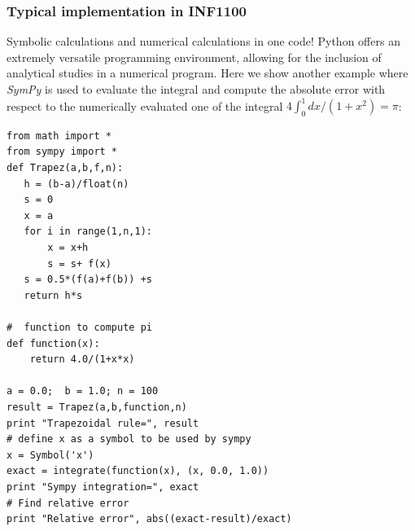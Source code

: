 \documentclass{beamer}
\begin{document}
\begin{frame}
\frametitle{Typical implementation in INF1100}

\begin{block}{Symbolic calculations and numerical calculations in one code! }
Python offers an  extremely versatile programming  environment, allowing for the inclusion of analytical studies in a numerical program. Here we show another example
where \emph{SymPy} is used to evaluate the integral and compute the absolute error 
with respect to the numerically evaluated one of the integral
$4\int_0^1 dx/(1+x^2) = \pi$: 
\begin{verbatim}
from math import *
from sympy import *
def Trapez(a,b,f,n):
   h = (b-a)/float(n)
   s = 0
   x = a
   for i in range(1,n,1):
       x = x+h
       s = s+ f(x)
   s = 0.5*(f(a)+f(b)) +s
   return h*s

#  function to compute pi
def function(x):
    return 4.0/(1+x*x)

a = 0.0;  b = 1.0; n = 100
result = Trapez(a,b,function,n)
print "Trapezoidal rule=", result
# define x as a symbol to be used by sympy
x = Symbol('x')
exact = integrate(function(x), (x, 0.0, 1.0))
print "Sympy integration=", exact
# Find relative error
print "Relative error", abs((exact-result)/exact)
\end{verbatim}
\end{block}
\end{frame}
\end{document}
